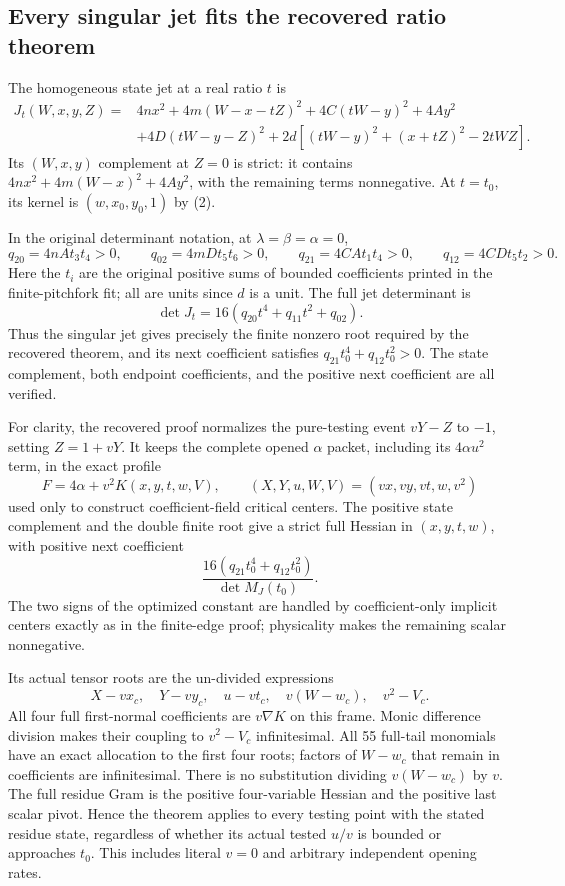\subsection*{Every singular jet fits the recovered ratio theorem}

The homogeneous state jet at a real ratio $t$ is
\begin{align*}
 J_t(W,x,y,Z)={}&4nx^2+4m(W-x-tZ)^2+4C(tW-y)^2+4Ay^2\\
 &+4D(tW-y-Z)^2
   +2d[(tW-y)^2+(x+tZ)^2-2tWZ].
\end{align*}
Its $(W,x,y)$ complement at $Z=0$ is strict: it contains
$4nx^2+4m(W-x)^2+4Ay^2$, with the remaining terms nonnegative.
At $t=t_0$, its kernel is $(w,x_0,y_0,1)$ by (2).

In the original determinant notation, at $\lambda=\beta=\alpha=0$,
\[
 q_{20}=4nAt_3t_4>0,\qquad q_{02}=4mDt_5t_6>0,
 \qquad q_{21}=4CAt_1t_4>0,\qquad q_{12}=4CDt_5t_2>0.
\]
Here the $t_i$ are the original positive sums of bounded coefficients
printed in the finite-pitchfork fit; all are units since $d$ is a
unit. The full jet determinant is
\[
 \det J_t=16(q_{20}t^4+q_{11}t^2+q_{02}).
\]
Thus the singular jet gives precisely the finite nonzero root required
by the recovered theorem, and its next coefficient satisfies
$q_{21}t_0^4+q_{12}t_0^2>0$. The state complement, both endpoint
coefficients, and the positive next coefficient are all verified.

For clarity, the recovered proof normalizes the pure-testing event
$vY-Z$ to $-1$, setting $Z=1+vY$. It keeps the complete opened
$\alpha$ packet, including its $4\alpha u^2$ term, in the exact
profile
\[
 F=4\alpha+v^2K(x,y,t,w,V),\qquad
 (X,Y,u,W,V)=(vx,vy,vt,w,v^2)
\]
used only to construct coefficient-field critical centers. The positive
state complement and the double finite root give a strict full Hessian
in $(x,y,t,w)$, with positive next coefficient
\[
 \frac{16(q_{21}t_0^4+q_{12}t_0^2)}{\det M_J(t_0)}.
\]
The two signs of the optimized constant are handled by coefficient-only
implicit centers exactly as in the finite-edge proof; physicality makes
the remaining scalar nonnegative.

Its actual tensor roots are the un-divided expressions
\[
 X-vx_c,\quad Y-vy_c,\quad u-vt_c,\quad v(W-w_c),
 \quad v^2-V_c.
\]
All four full first-normal coefficients are $v\nabla K$ on this
frame. Monic difference division makes their coupling to $v^2-V_c$
infinitesimal. All 55 full-tail monomials have an exact allocation to
the first four roots; factors of $W-w_c$ that remain in coefficients
are infinitesimal. There is no substitution dividing $v(W-w_c)$ by
$v$. The full residue Gram is the positive four-variable Hessian and
the positive last scalar pivot. Hence the theorem applies to every
testing point with the stated residue state, regardless of whether its
actual tested $u/v$ is bounded or approaches $t_0$. This includes literal
$v=0$ and arbitrary independent opening rates.

